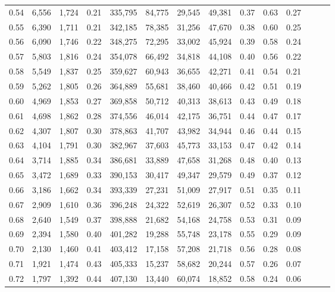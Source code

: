 \begin{tabular}{rrrrrrrrrrrrrr}
0.54 &  6,556 &  1,724 &  0.21 &  335,795 &   84,775 &  29,545 &  49,381 &  0.37 &  0.63 &      0.27 \\
0.55 &  6,390 &  1,711 &  0.21 &  342,185 &   78,385 &  31,256 &  47,670 &  0.38 &  0.60 &      0.25 \\
0.56 &  6,090 &  1,746 &  0.22 &  348,275 &   72,295 &  33,002 &  45,924 &  0.39 &  0.58 &      0.24 \\
0.57 &  5,803 &  1,816 &  0.24 &  354,078 &   66,492 &  34,818 &  44,108 &  0.40 &  0.56 &      0.22 \\
0.58 &  5,549 &  1,837 &  0.25 &  359,627 &   60,943 &  36,655 &  42,271 &  0.41 &  0.54 &      0.21 \\
0.59 &  5,262 &  1,805 &  0.26 &  364,889 &   55,681 &  38,460 &  40,466 &  0.42 &  0.51 &      0.19 \\
0.60 &  4,969 &  1,853 &  0.27 &  369,858 &   50,712 &  40,313 &  38,613 &  0.43 &  0.49 &      0.18 \\
0.61 &  4,698 &  1,862 &  0.28 &  374,556 &   46,014 &  42,175 &  36,751 &  0.44 &  0.47 &      0.17 \\
0.62 &  4,307 &  1,807 &  0.30 &  378,863 &   41,707 &  43,982 &  34,944 &  0.46 &  0.44 &      0.15 \\
0.63 &  4,104 &  1,791 &  0.30 &  382,967 &   37,603 &  45,773 &  33,153 &  0.47 &  0.42 &      0.14 \\
0.64 &  3,714 &  1,885 &  0.34 &  386,681 &   33,889 &  47,658 &  31,268 &  0.48 &  0.40 &      0.13 \\
0.65 &  3,472 &  1,689 &  0.33 &  390,153 &   30,417 &  49,347 &  29,579 &  0.49 &  0.37 &      0.12 \\
0.66 &  3,186 &  1,662 &  0.34 &  393,339 &   27,231 &  51,009 &  27,917 &  0.51 &  0.35 &      0.11 \\
0.67 &  2,909 &  1,610 &  0.36 &  396,248 &   24,322 &  52,619 &  26,307 &  0.52 &  0.33 &      0.10 \\
0.68 &  2,640 &  1,549 &  0.37 &  398,888 &   21,682 &  54,168 &  24,758 &  0.53 &  0.31 &      0.09 \\
0.69 &  2,394 &  1,580 &  0.40 &  401,282 &   19,288 &  55,748 &  23,178 &  0.55 &  0.29 &      0.09 \\
0.70 &  2,130 &  1,460 &  0.41 &  403,412 &   17,158 &  57,208 &  21,718 &  0.56 &  0.28 &      0.08 \\
0.71 &  1,921 &  1,474 &  0.43 &  405,333 &   15,237 &  58,682 &  20,244 &  0.57 &  0.26 &      0.07 \\
0.72 &  1,797 &  1,392 &  0.44 &  407,130 &   13,440 &  60,074 &  18,852 &  0.58 &  0.24 &      0.06 \\

\end{tabular}
